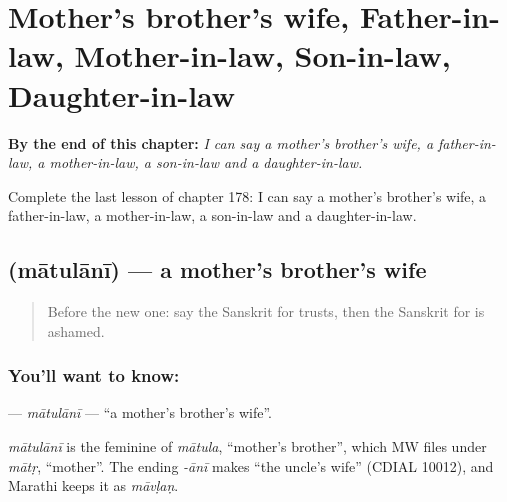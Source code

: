 
\chapter{Mother's brother's wife, Father-in-law, Mother-in-law, Son-in-law, Daughter-in-law}
\label{ch:sa-mother-s-brother-s-wife-father-in-law-mother-in-law-son-in-law-daughter-in-law}

\begin{chapteropening}
\textbf{By the end of this chapter:} \emph{I can say a mother's brother's wife, a father-in-law, a mother-in-law, a son-in-law and a daughter-in-law.}

Complete the last lesson of chapter 178: I can say a mother's brother's wife, a father-in-law, a mother-in-law, a son-in-law and a daughter-in-law.
\end{chapteropening}

\section[\texorpdfstring{\sk{मातुलानी} (mātulānī)}{मातुलानी (mātulānī)}]{ (mātulānī) — a mother's brother's wife}

\label{lesson:SA-C178-matulani}



\begin{quote}
Before the new one: say the Sanskrit for trusts, then the Sanskrit for is ashamed.
\end{quote}

\subsection*{You'll want to know: }
\textbf{} — \emph{mātulānī} — \textquotedblleft{}a mother's brother's wife\textquotedblright{}.

\begin{cousinweb}
\emph{mātulānī} is the feminine of \emph{mātula}, \textquotedblleft{}mother's brother\textquotedblright{}, which MW files under \emph{mātṛ}, \textquotedblleft{}mother\textquotedblright{}. The ending \emph{-ānī} makes \textquotedblleft{}the uncle's wife\textquotedblright{} (CDIAL 10012), and Marathi keeps it as \emph{māvḷaṇ}.
\end{cousinweb}

